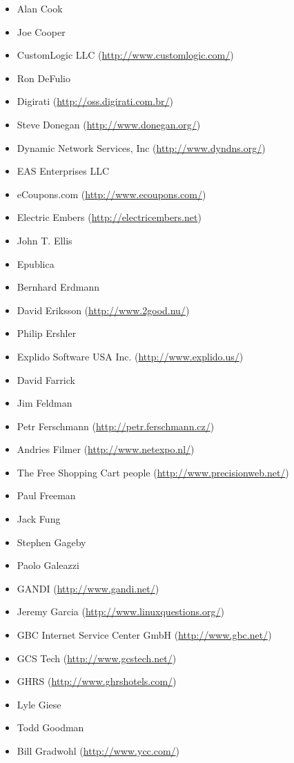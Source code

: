 \documentclass[a4paper,titlepage,12pt]{article}
\begin{document}
\begin{itemize}
	\item Alan Cook
	\item Joe Cooper
	\item CustomLogic LLC (\url{http://www.customlogic.com/})
	\item Ron DeFulio
	\item Digirati (\url{http://oss.digirati.com.br/})
	\item Steve Donegan (\url{http://www.donegan.org/})
	\item Dynamic Network Services, Inc (\url{http://www.dyndns.org/})
	\item EAS Enterprises LLC
	\item eCoupons.com (\url{http://www.ecoupons.com/})
	\item Electric Embers (\url{http://electricembers.net})
	\item John T. Ellis
	\item Epublica
	\item Bernhard Erdmann
	\item David Eriksson (\url{http://www.2good.nu/})
	\item Philip Ershler
	\item Explido Software USA Inc. (\url{http://www.explido.us/})
	\item David Farrick
	\item Jim Feldman
	\item Petr Ferschmann (\url{http://petr.ferschmann.cz/})
	\item Andries Filmer (\url{http://www.netexpo.nl/})
	\item The Free Shopping Cart people (\url{http://www.precisionweb.net/})
	\item Paul Freeman
	\item Jack Fung
	\item Stephen Gageby
	\item Paolo Galeazzi
	\item GANDI (\url{http://www.gandi.net/})
	\item Jeremy Garcia (\url{http://www.linuxquestions.org/})
	\item GBC Internet Service Center GmbH (\url{http://www.gbc.net/})
	\item GCS Tech (\url{http://www.gcstech.net/})
	\item GHRS (\url{http://www.ghrshotels.com/})
	\item Lyle Giese
	\item Todd Goodman
	\item Bill Gradwohl (\url{http://www.ycc.com/})

\end{itemize}
\end{document}

